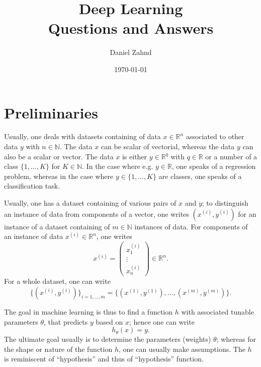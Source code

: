 \documentclass[a4paper,11pt]{article}
\title{Deep Learning\\ \vspace{0.2cm}\normalsize Questions and Answers}
\author{Daniel Zahnd}
\date{\today}
\newcounter{question}
\numberwithin{equation}{section}
\begin{document}
\newcommand\Que[1]{%
   \leavevmode\par
   \stepcounter{question}
   \noindent
   \thequestion. \textbf{Q} --- #1\par}

\newcommand\Ans[2][]{%
    \leavevmode\par\noindent
   {\leftskip0pt
    \textbf{A} --- \textbf{#1}#2\par}}

\maketitle
\tableofcontents

\setcounter{page}{1}


\section{Preliminaries}
Usually, one deals with datasets containing of data $x \in \mathbb{R}^n$ associated to other data $y$ with $n \in \mathbb{N}$. The data $x$ can be scalar of vectorial, whereas the data $y$ can also be a scalar or vector. The data $x$ is either $y \in \mathbb{R}^q$ with $q \in \mathbb{R}$ or a number of a class $\{1,\dots,K\}$ for $K \in \mathbb{N}$. In the case where e.g. $y \in \mathbb{R}$, one speaks of a regression problem, whereas in the case where $y \in\{1,\dots,K\}$ are classes, one speaks of a classification task.

Usually, one has a dataset containing of various pairs of $x$ and $y$; to distinguish an instance of data from components of a vector, one writes $(x^{(i)}, y^{(i)})$ for an instance of a dataset containing of $m \in \mathbb{N}$ instances of data. For components of an instance of data $x^{(i)} \in \mathbb{R}^n$, one writes \begin{equation}
	x^{(i)} = \begin{pmatrix}
		x^{(i)}_1 \\ \vdots \\ x^{(i)}_n
	\end{pmatrix} \in \mathbb{R}^n.
\end{equation} For a whole dataset, one can write \begin{equation}
	\{(x^{(i)}, y^{(i)})\}_{i=1,\dots,m} = \{(x^{(1)}, y^{(1)}), \dots , (x^{(m)}, y^{(m)})\}.
\end{equation}

The goal in machine learning is thus to find a function $h$ with associated tunable parameters $\theta$, that predicts $y$ based on $x$; hence one can write \begin{equation}
	h_\theta(x) = y.
\end{equation} The ultimate goal usually is to determine the parameters (weights) $\theta$; whereas for the shape or nature of the function $h$, one can usually make assumptions. The $h$ is reminiscent of ``hypothesis'' and thus of ``hypothesis'' function.
\end{document}
